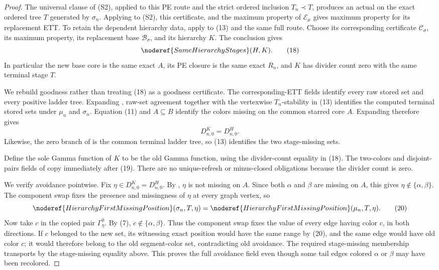 \begin{proof}
The universal clause of (S2), applied to this PE route and the strict
ordered inclusion \(T_n\prec T\), produces an actual
 on the exact ordered tree
\(T\) generated by \(\sigma_n\).  Applying
 to (S2), this certificate, and the
maximum property of \(\mathcal E_\mu\) gives maximum property for its
replacement ETT.  To retain the dependent hierarchy data, apply
 to (13) and the same full route.  Choose its
corresponding certificate \(\mathcal C_\sigma\), its maximum property,
its replacement base \(\mathcal B_\sigma\), and its hierarchy \(K\).
The conclusion gives
\[
                 \noderef{SameHierarchyStages}(H,K).           \tag{18}
\]
In particular the new base core is the same exact \(A\), its PE closure
is the same exact \(R_n\), and \(K\) has divider count zero with the same
terminal stage \(T\).

We rebuild goodness rather than treating (18) as a goodness certificate.
The corresponding-ETT fields identify every raw stored set and every
positive ladder tree.  Expanding
, raw-set agreement together with the
vertexwise \(T_n\)-stability in (13) identifies the computed terminal
stored sets under \(\mu_n\) and \(\sigma_n\).  Equation (11) and
\(A\subseteq B\) identify the colors missing on the common starred core
\(A\).  Expanding  therefore gives
\[
                 D^K_{n,0}=D^H_{n,0}.                         \tag{19}
\]
Likewise, the zero branch of
 is the common terminal ladder tree,
so (13) identifies the two stage-missing sets.

Define the sole Gamma function of \(K\) to be the old Gamma function,
using the divider-count equality in (18).  The two-colors and
disjoint-pairs fields of  copy immediately after
(19).  There are no unique-refresh or minus-closed obligations because
the divider count is zero.

We verify avoidance pointwise.  Fix
\(\eta\in D^K_{n,0}=D^H_{n,0}\).  By
, \(\eta\) is not missing on \(A\).
Since both \(\alpha\) and \(\beta\) are missing on \(A\), this gives
\(\eta\notin\{\alpha,\beta\}\).  The component swap fixes the presence
and missingness of \(\eta\) at every graph vertex, so
\[
 \noderef{HierarchyFirstMissingPosition}(\sigma_n,T,\eta)
 =
 \noderef{HierarchyFirstMissingPosition}(\mu_n,T,\eta).        \tag{20}
\]
Now take \(c\) in the copied pair \(\Gamma^0_\eta\).  By (7),
\(c\notin\{\alpha,\beta\}\).  Thus the component swap fixes the value of
every edge having color \(c\), in both directions.  If \(c\) belonged to
the new  set, its witnessing exact
position would have the same range by (20), and the same edge would have
old color \(c\); it would therefore belong to the old segment-color set,
contradicting old avoidance.  The required stage-missing membership
transports by the stage-missing equality above.  This proves the full
avoidance field even though some tail edges colored \(\alpha\) or
\(\beta\) may have been recolored.


\end{proof}
